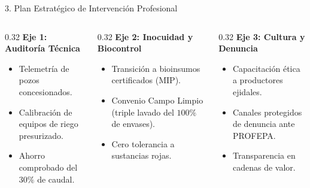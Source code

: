 \documentclass[
  spanish,
  aspectratio=169,
  xcolor={dvipsnames,table}
]{beamer}
\begin{document}
\begin{frame}{3. Plan Estratégico de Intervención Profesional}
  \begin{columns}[T]
    \begin{column}{0.32\textwidth}
      \textbf{\color{uanlblue}Eje 1: Auditoría Técnica}
      \begin{itemize}
        \item Telemetría de pozos concesionados.
        \item Calibración de equipos de riego presurizado.
        \item Ahorro comprobado del $30\%$ de caudal.
      \end{itemize}
    \end{column}
    \begin{column}{0.32\textwidth}
      \textbf{\color{uanlblue}Eje 2: Inocuidad y Biocontrol}
      \begin{itemize}
        \item Transición a bioinsumos certificados (MIP).
        \item Convenio Campo Limpio (triple lavado del $100\%$ de envases).
        \item Cero tolerancia a sustancias rojas.
      \end{itemize}
    \end{column}
    \begin{column}{0.32\textwidth}
      \textbf{\color{uanlblue}Eje 3: Cultura y Denuncia}
      \begin{itemize}
        \item Capacitación ética a productores ejidales.
        \item Canales protegidos de denuncia ante PROFEPA.
        \item Transparencia en cadenas de valor.
      \end{itemize}
    \end{column}
  \end{columns}
\end{frame}
\end{document}
